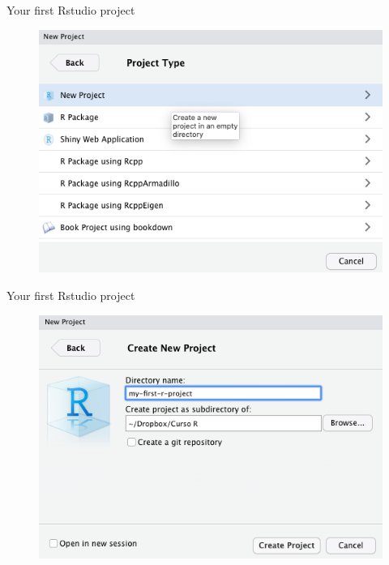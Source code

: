 \documentclass[ignorenonframetext,]{beamer}
\begin{document}
\begin{frame}{Your first Rstudio project}
\protect\hypertarget{your-first-rstudio-project-2}{}

\begin{figure}
\includegraphics[scale=0.43]{figures/new-project-3}
\end{figure}

\end{frame}

\begin{frame}{Your first Rstudio project}
\protect\hypertarget{your-first-rstudio-project-3}{}

\begin{figure}
\includegraphics[scale=0.43]{figures/new-project-4}
\end{figure}

\end{frame}
\end{document}
